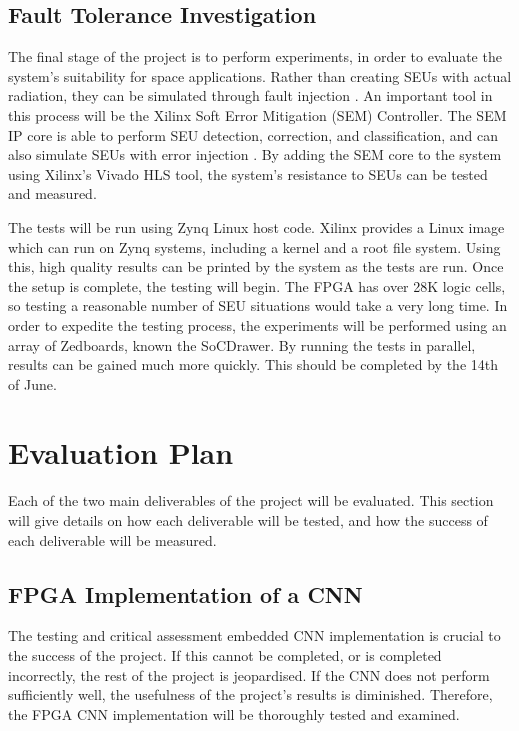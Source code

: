 \documentclass[12pt]{article}
\begin{document}
\subsection{Fault Tolerance Investigation}
\label{sec:ImpPlan-FaultTolInv}
\vspace{-12pt}

The final stage of the project is to perform experiments, in order to evaluate the system's suitability for space applications. Rather than creating SEUs with actual radiation, they can be simulated through fault injection \cite{FaultInjection}. An important tool in this process will be the Xilinx Soft Error Mitigation (SEM) Controller. The SEM IP core is able to perform SEU detection, correction, and classification, and can also simulate SEUs with error injection \cite{ManualSEM}. By adding the SEM core to the system using Xilinx's Vivado HLS tool, the system's resistance to SEUs can be tested and measured. 

The tests will be run using Zynq Linux host code. Xilinx provides a Linux image which can run on Zynq systems, including a kernel and a root file system. Using this, high quality results can be printed by the system as the tests are run. Once the setup is complete, the testing will begin. The FPGA has over 28K logic cells, so testing a reasonable number of SEU situations would take a very long time. In order to expedite the testing process, the experiments will be performed using an array of Zedboards, known the SoCDrawer. By running the tests in parallel, results can be gained much more quickly. This should be completed by the 14th of June.

\section{Evaluation Plan}
\label{sec:EvalPlan}
\vspace{-12pt}

Each of the two main deliverables of the project will be evaluated. This section will give details on how each deliverable will be tested, and how the success of each deliverable will be measured.

\subsection{FPGA Implementation of a CNN}
\label{sec:EvalPlan-FPGAImplOfCnn}
\vspace{-12pt}

The testing and critical assessment embedded CNN implementation is crucial to the success of the project. If this cannot be completed, or is completed  incorrectly, the rest of the project is jeopardised. If the CNN does not perform sufficiently well, the usefulness of the project's results is diminished. Therefore, the FPGA CNN implementation will be thoroughly tested and examined.
\end{document}
